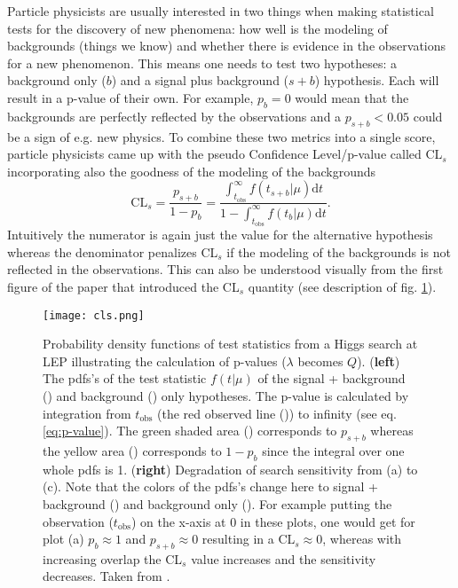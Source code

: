 Particle physicists are usually interested in two things when making statistical tests for the discovery of new phenomena: how well is the modeling of backgrounds (things we know) and whether there is evidence in the observations for a new phenomenon. This means one needs to test two hypotheses: a background only ($b$) and a signal plus background ($s+b$) hypothesis. Each will result in a p-value of their own. For example, $p_{b}=0$ would mean that the backgrounds are perfectly reflected by the observations and a $p_{s+b} < 0.05$ could be a sign of e.g. new physics. To combine these two metrics into a single score, particle physicists came up with the pseudo Confidence Level/p-value called CL$_s$ incorporating also the goodness of the modeling of the backgrounds 
\begin{equation}
    \mathrm{CL}_s=\frac{p_{s+b}}{1-p_{b}}=
    \frac
    {\int_{t_\text{obs}}^{\infty} 
    f(t_{s+b} | \mu) \mathrm{d}t}
    {1-\int_{t_\text{obs}}^{\infty} 
    f(t_{b} | \mu) \mathrm{d}t}.
\end{equation}
Intuitively the numerator is again just the value for the alternative hypothesis whereas the denominator penalizes CL$_s$ if the modeling of the backgrounds is not reflected in the observations. This can also be understood visually from the first figure of the paper that introduced the CL$_s$ quantity \citep{read2002presentation} (see description of fig. \ref{fig:cls}).
\begin{figure}
    \centering
    \texttt{[image: cls.png]}
        \caption[]{Probability density functions of test statistics from a Higgs search at LEP illustrating the calculation of p-values ($\lambda$ becomes $Q$). (\textbf{left}) The \acp{pdf}'s of the test statistic $f(t | \mu)$ of the signal + background ({\color[HTML]{804000}{$\bm{\diagup}$}}) and background ({\color[HTML]{2100FF}{$\bm{\diagup}$}}) only hypotheses. The p-value is calculated by integration from $t_\text{obs}$ (the red observed line ({\color[HTML]{FF0000}{$\bm{\diagup}$}})) to infinity (see eq. \ref{eq:p-value}). The green shaded area () corresponds to $p_{s+b}$ whereas the yellow area () corresponds to $1-p_b$ since the integral over one whole \acp{pdf} is 1. (\textbf{right}) Degradation of search sensitivity from (a) to (c). Note that the colors of the \acp{pdf}'s change here to signal + background () and background only (). For example putting the observation ($t_\text{obs}$) on the x-axis at 0 in these plots, one would get for plot (a) $p_{b}\approx 1$ and $p_{s+b}\approx 0$ resulting in a CL$_s\approx 0$, whereas with increasing overlap the CL$_s$ value increases and the sensitivity decreases.
        Taken from \citep{read2002presentation}.}
    \label{fig:cls}    
\end{figure}



